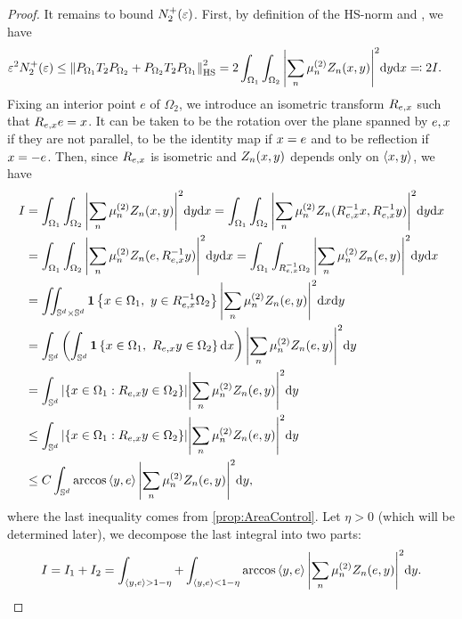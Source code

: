 \begin{proof}
  It remains to bound $N_2^+(\varepsilon)$.
  First, by definition of the HS-norm and \citet[Theorem 3.8.5]{simon2015_OperatorTheory}, we have
  \begin{align}
    \label{eq:Proof_MainLemma_N2_Int}
    \varepsilon^2 N_2^+(\varepsilon) & \leq \norm{P_{\Omega_1}T_2 P_{\Omega_2}+P_{\Omega_2}T_2 P_{\Omega_1}}_{\mathrm{HS}}^2
    = 2 \int_{\Omega_1} \int_{\Omega_2} \abs{\sum_{n} \mu_n^{(2)} Z_n(x,y)}^2 \dd y \dd x \eqqcolon 2 I.
  \end{align}
  Fixing an interior point ${e}$ of $\Omega_2$,
  we introduce an isometric transform $R_{{e},x}$ such that $R_{{e},x} {e} = x$.
  It can be taken to be the rotation over the plane spanned by ${e},x$ if they are not parallel,
  to be the identity map if $x = {e}$ and to be reflection if $x = -{e}$.
  Then, since $R_{{e},x}$ is isometric and $Z_n(x,y)$ depends only on $\left\langle{x,y}\right\rangle$, we have
  \begin{align*}
    I &= \int_{\Omega_1} \int_{\Omega_2} \abs{\sum_{n} \mu_n^{(2)} Z_n(x,y)}^2 \dd y \dd x
    = \int_{\Omega_1}\int_{\Omega_2} \abs{\sum_{n} \mu_n^{(2)} Z_n(R_{{e},x}^{-1} x,R_{{e},x}^{-1} y)}^2 \dd y \dd x \\
    &= \int_{\Omega_1}\int_{\Omega_2} \abs{\sum_{n} \mu_n^{(2)} Z_n({e},R_{{e},x}^{-1} y)}^2 \dd y \dd x
    = \int_{\Omega_1}\int_{R_{{e},x}^{-1} \Omega_2}\abs{\sum_{n} \mu_n^{(2)} Z_n({e},y)}^2 \dd y \dd x \\
    &= \iint_{\mathbb{S}^d \times \mathbb{S}^d} \bm{1}\left\{ x \in \Omega_1,~ y \in R_{{e},x}^{-1} \Omega_2 \right\} \abs{\sum_n \mu_n^{(2)} Z_n({e},y)}^2 \dd x \dd y \\
    & = \int_{\mathbb{S}^d}\left( \int_{\mathbb{S}^d} \bm{1}\left\{ x \in \Omega_1,~ R_{{e},x} y \in \Omega_2 \right\} \dd x \right) \abs{\sum_n \mu_n^{(2)} Z_n({e},y)}^2 \dd y  \\
    &= \int_{\mathbb{S}^d} \abs{\left\{ x \in \Omega_1 : R_{{e},x} y \in \Omega_2 \right\}} \abs{\sum_n \mu_n^{(2)} Z_n({e},y)}^2 \dd y \\
    & \leq \int_{\mathbb{S}^d} \abs{\left\{ x \in \Omega_1 : R_{{e},x} y \in \Omega_2 \right\}} \abs{\sum_{n} \mu_n^{(2)} Z_n({e},y)}^2 \dd y \\
    & \leq C \int_{\mathbb{S}^d} \arccos \left\langle{y,{e}}\right\rangle  \abs{\sum_{n} \mu_n^{(2)} Z_n({e},y)}^2 \dd y,
  \end{align*}
  where the last inequality comes from \cref{prop:AreaControl}.
  Let $\eta > 0$ (which will be determined later), we decompose the last integral into two parts:
  \begin{align*}
    I = I_1 + I_2 = \int_{\left\langle{y,{e}}\right\rangle > 1-\eta}  + \int_{\left\langle{y,{e}}\right\rangle < 1-\eta} \arccos \left\langle{y,{e}}\right\rangle \abs{\sum_{n} \mu_n^{(2)} Z_n({e},y)}^2 \dd y.
  \end{align*}


\end{proof}
